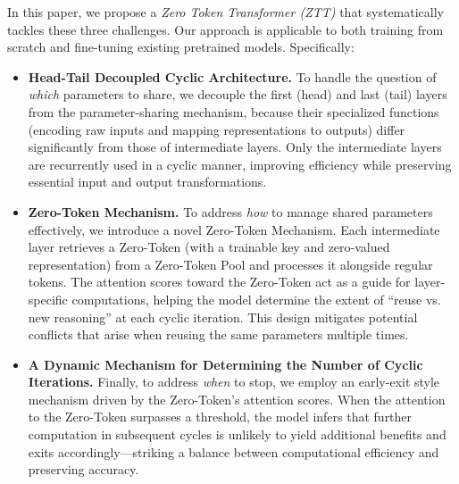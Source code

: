 In this paper, we propose a \emph{Zero Token Transformer (ZTT)} that systematically tackles these three challenges. Our approach is applicable to both training from scratch and fine-tuning existing pretrained models. Specifically:

\begin{itemize}
    \item \textbf{Head-Tail Decoupled Cyclic Architecture.} To handle the question of \emph{which} parameters to share, we decouple the first (head) and last (tail) layers from the parameter-sharing mechanism, because their specialized functions (encoding raw inputs and mapping representations to outputs) differ significantly from those of intermediate layers. Only the intermediate layers are recurrently used in a cyclic manner, improving efficiency while preserving essential input and output transformations.

    \item \textbf{Zero-Token Mechanism.} To address \emph{how} to manage shared parameters effectively, we introduce a novel {Zero-Token Mechanism}. Each intermediate layer retrieves a Zero-Token (with a trainable key and zero-valued representation) from a Zero-Token Pool and processes it alongside regular tokens. The attention scores toward the Zero-Token act as a guide for layer-specific computations, helping the model determine the extent of “reuse vs. new reasoning” at each cyclic iteration. This design mitigates potential conflicts that arise when reusing the same parameters multiple times.

    \item \textbf{A Dynamic Mechanism for Determining the Number of Cyclic Iterations.} Finally, to address \emph{when} to stop, we employ an early-exit style mechanism driven by the Zero-Token’s attention scores. When the attention to the Zero-Token surpasses a threshold, the model infers that further computation in subsequent cycles is unlikely to yield additional benefits and exits accordingly—striking a balance between computational efficiency and preserving accuracy.
\end{itemize}



